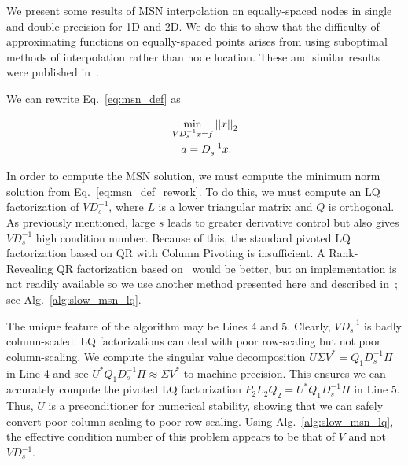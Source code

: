 We present some results of MSN interpolation on equally-spaced
nodes in single and double precision for 1D and 2D.
We do this to show that the difficulty of approximating
functions on equally-spaced points arises from using suboptimal methods
of interpolation rather than node location.
These and similar results were published in~\cite{msnInterp,msnBirkhoff}.

We can rewrite Eq.~\eqref{eq:msn_def} as

\begin{align}
    &\min_{VD_{s}^{-1}x=f} \left| \left| x \right| \right|_{2} \nonumber\\
    &\quad a = D_{s}^{-1}x.
    \label{eq:msn_def_rework}
\end{align}

\noindent
In order to compute the MSN solution,
we must compute the minimum norm solution from Eq.~\eqref{eq:msn_def_rework}.
To do this, we must compute an LQ factorization of $VD_{s}^{-1}$,
where $L$ is a lower triangular matrix and $Q$ is orthogonal.
As previously mentioned, large $s$ leads to greater derivative control
but also gives $VD_{s}^{-1}$ high condition number. Because
of this, the standard pivoted LQ factorization based on QR with
Column Pivoting is insufficient. A Rank-Revealing QR factorization
based on~\cite{gu1996efficient} would be better, but an 
implementation is not readily available so we use another method presented
here and described in~\cite{msnBirkhoff}; see Alg.~\ref{alg:slow_msn_lq}.



The unique feature of the algorithm may be Lines 4 and 5.
Clearly, $VD_{s}^{-1}$ is badly column-scaled.
LQ factorizations can deal with poor row-scaling but not poor column-scaling.
We compute the singular value decomposition
$U\Sigma V^{*} = Q_{1}D_{s}^{-1}\Pi$ in Line 4 and
see $U^{*}Q_{1}D_{s}^{-1}\Pi \approx \Sigma V^{*}$ to machine precision.
This ensures we can accurately compute the pivoted LQ
factorization $P_{2}L_{2}Q_{2} = U^{*}Q_{1}D_{s}^{-1}\Pi$ in Line 5.
Thus, $U$ is a preconditioner for numerical stability, showing
that we can safely convert poor column-scaling to poor row-scaling.
Using Alg.~\ref{alg:slow_msn_lq}, the effective condition number of this
problem appears to be that of $V$ and not $VD_{s}^{-1}$.

